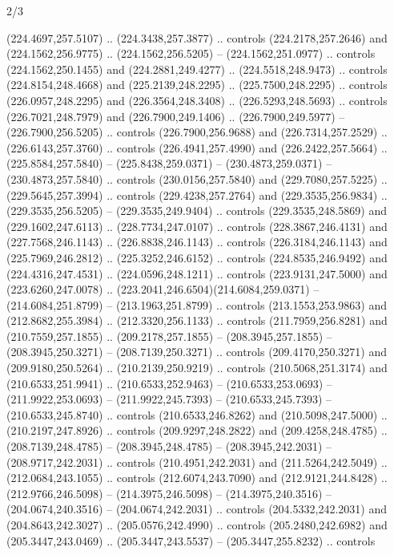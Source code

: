 \begin{flagdescription}{2/3}
\begin{scope}[xshift=0.5\flaglength,yshift=0.5\flagwidth,scale=\flagwidth/235.81]
\begin{scope}[y=0.8pt, x=0.8pt, yscale=-1,shift={(-239.08,-147.38)}]
    (224.4697,257.5107) .. (224.3438,257.3877) .. controls (224.2178,257.2646) and
    (224.1562,256.9775) .. (224.1562,256.5205) -- (224.1562,251.0977) .. controls
    (224.1562,250.1455) and (224.2881,249.4277) .. (224.5518,248.9473) .. controls
    (224.8154,248.4668) and (225.2139,248.2295) .. (225.7500,248.2295) .. controls
    (226.0957,248.2295) and (226.3564,248.3408) .. (226.5293,248.5693) .. controls
    (226.7021,248.7979) and (226.7900,249.1406) .. (226.7900,249.5977) --
    (226.7900,256.5205) .. controls (226.7900,256.9688) and (226.7314,257.2529) ..
    (226.6143,257.3760) .. controls (226.4941,257.4990) and (226.2422,257.5664) ..
    (225.8584,257.5840) -- (225.8438,259.0371) -- (230.4873,259.0371) --
    (230.4873,257.5840) .. controls (230.0156,257.5840) and (229.7080,257.5225) ..
    (229.5645,257.3994) .. controls (229.4238,257.2764) and (229.3535,256.9834) ..
    (229.3535,256.5205) -- (229.3535,249.9404) .. controls (229.3535,248.5869) and
    (229.1602,247.6113) .. (228.7734,247.0107) .. controls (228.3867,246.4131) and
    (227.7568,246.1143) .. (226.8838,246.1143) .. controls (226.3184,246.1143) and
    (225.7969,246.2812) .. (225.3252,246.6152) .. controls (224.8535,246.9492) and
    (224.4316,247.4531) .. (224.0596,248.1211) .. controls (223.9131,247.5000) and
    (223.6260,247.0078) .. (223.2041,246.6504)(214.6084,259.0371) --
    (214.6084,251.8799) -- (213.1963,251.8799) .. controls (213.1553,253.9863) and
    (212.8682,255.3984) .. (212.3320,256.1133) .. controls (211.7959,256.8281) and
    (210.7559,257.1855) .. (209.2178,257.1855) -- (208.3945,257.1855) --
    (208.3945,250.3271) -- (208.7139,250.3271) .. controls (209.4170,250.3271) and
    (209.9180,250.5264) .. (210.2139,250.9219) .. controls (210.5068,251.3174) and
    (210.6533,251.9941) .. (210.6533,252.9463) -- (210.6533,253.0693) --
    (211.9922,253.0693) -- (211.9922,245.7393) -- (210.6533,245.7393) --
    (210.6533,245.8740) .. controls (210.6533,246.8262) and (210.5098,247.5000) ..
    (210.2197,247.8926) .. controls (209.9297,248.2822) and (209.4258,248.4785) ..
    (208.7139,248.4785) -- (208.3945,248.4785) -- (208.3945,242.2031) --
    (208.9717,242.2031) .. controls (210.4951,242.2031) and (211.5264,242.5049) ..
    (212.0684,243.1055) .. controls (212.6074,243.7090) and (212.9121,244.8428) ..
    (212.9766,246.5098) -- (214.3975,246.5098) -- (214.3975,240.3516) --
    (204.0674,240.3516) -- (204.0674,242.2031) .. controls (204.5332,242.2031) and
    (204.8643,242.3027) .. (205.0576,242.4990) .. controls (205.2480,242.6982) and
    (205.3447,243.0469) .. (205.3447,243.5537) -- (205.3447,255.8232) .. controls

\end{scope}
\end{scope}
\end{flagdescription}
